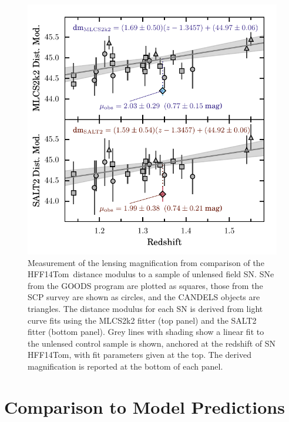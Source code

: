 \documentclass[iop]{emulateapj}
\def\tomas{HFF14Tom}
\begin{document}
\begin{figure}
\begin{center}
\includegraphics[width=\columnwidth]{snTomas_hubble_diagram}
\caption{ Measurement of the lensing magnification from comparison of
the \tomas\ distance modulus to a sample of unlensed field SN.  SNe
from the GOODS program are plotted as squares, those from the SCP
survey are shown as circles, and the CANDELS objects are triangles.
The distance modulus for each SN is derived from light curve fits
using the MLCS2k2 fitter (top panel) and the SALT2 fitter (bottom
panel).  Grey lines with shading show a linear fit to the unlensed
control sample is shown, anchored at the redshift of SN \tomas, with
fit parameters given at the top.  The derived magnification is
reported at the bottom of each panel.
\label{fig:MagnificationMeasurement} }
\end{center}
\end{figure}

\section{Comparison to Model Predictions}
\label{sec:Discussion}
\label{sec:ComparisonToModelPredictions}
\end{document}
